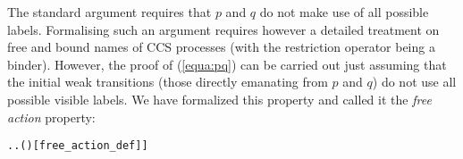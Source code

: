 The standard argument \cite{Mil89} requires that $p$
and $q$ do not make use of all possible labels.
Formalising such an argument requires however 
a detailed
treatment on free and bound names  of CCS
processes (with the restriction operator being a binder).
However, the proof of (\ref{equa:pq}) can be carried out 
just assuming that the
initial weak transitions (those directly emanating from 
 $p$ and $q$) do not use all possible visible labels.
We
have formalized this property and
 called it the \emph{free action} property:
\begin{alltt}
  \HOLSymConst{\HOLTokenEquiv{}} \HOLSymConst{\HOLTokenExists{}}. \HOLSymConst{\HOLTokenForall{}}. \HOLSymConst{\HOLTokenNeg{}}( \HOLTokenWeakTransBegin{} \HOLTokenWeakTransEnd {})\hfill{[free_action_def]]}
\end{alltt}

